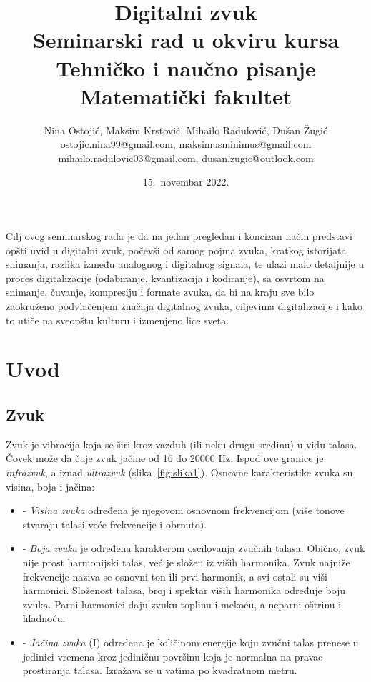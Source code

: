 \documentclass[a4paper]{article}
\begin{document}
\title{Digitalni zvuk\\ \small{Seminarski rad u okviru kursa\\Tehničko i naučno pisanje\\ Matematički fakultet}}

\author{Nina Ostojić, Maksim Krstović, Mihailo Radulović, Dušan Žugić\\ostojic.nina99@gmail.com, maksimusminimus@gmail.com\\ mihailo.radulovic03@gmail.com, dusan.zugic@outlook.com}
\date{15.~novembar 2022.}
\maketitle

\abstract
Cilj ovog seminarskog rada je da na jedan pregledan i koncizan način predstavi opšti uvid u digitalni zvuk, počevši od samog pojma zvuka, kratkog istorijata snimanja, razlika između analognog i digitalnog signala, te ulazi malo detaljnije u proces digitalizacije (odabiranje, kvantizacija i kodiranje), sa osvrtom na snimanje, čuvanje, kompresiju i formate zvuka, da bi na kraju sve bilo zaokruženo podvlačenjem značaja digitalnog zvuka, ciljevima digitalizacije i kako to utiče na sveopštu kulturu i izmenjeno lice sveta.

\tableofcontents

\newpage

\section{Uvod}
    \subsection{Zvuk}
    Zvuk je vibracija koja se širi kroz vazduh (ili neku drugu sredinu) u vidu talasa. Čovek može da čuje zvuk jačine od 16 do 20000 Hz. Ispod ove granice je \textit{infrazvuk}, a iznad \textit{ultrazvuk} (slika~\ref{fig:slika1}). Osnovne karakteristike zvuka su visina, boja i jačina:
    \begin {itemize}
        \item[-] \textit{Visina zvuka} određena je njegovom osnovnom frekvencijom (više tonove stvaraju talasi
        veće frekvencije i obrnuto).
    
        \item[-] \textit{Boja zvuka} je određena karakterom oscilovanja zvučnih talasa. Obično, zvuk nije prost
        harmonijski talas, već je složen iz viših harmonika. Zvuk najniže frekvencije naziva se osnovni ton ili prvi harmonik, a svi ostali su viši harmonici. Složenost talasa, broj i spektar viših
        harmonika određuje boju zvuka. Parni harmonici daju zvuku toplinu i mekoću, a neparni
        oštrinu i hladnoću.
    
        \item[-] \textit{Jačina zvuka} (I) određena je količinom energije koju zvučni talas prenese u jedinici
        vremena kroz jediničnu površinu koja je normalna na pravac prostiranja talasa. Izražava se
        u vatima po kvadratnom metru.
    \end{itemize}
  
\end{document}
